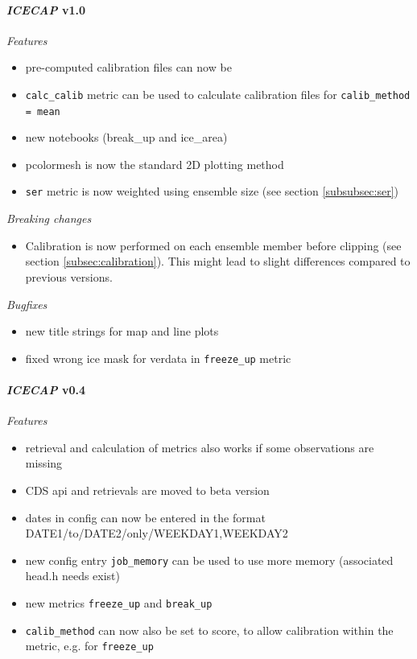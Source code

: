 \documentclass[DIV=10, parskip=full]{scrreprt}
\newcommand{\ice}{\textit{ICECAP}\xspace}
\begin{document}
\paragraph{\textbf{\ice v1.0\\[5pt]}}
\textit{Features}
\begin{itemize}
	\item pre-computed calibration files can now be 
	\item \texttt{calc\_calib} metric can be used to calculate calibration files for \texttt{calib\_method = mean}
	\item new notebooks (break\_up and ice\_area)
	\item pcolormesh is now the standard 2D plotting method
	\item \texttt{ser} metric is now weighted using ensemble size (see section \ref{subsubsec:ser})
\end{itemize}

\textit{Breaking changes}
\begin{itemize}
	\item Calibration is now performed on each ensemble member before clipping (see section \ref{subsec:calibration}). This might lead to slight differences compared to previous versions.
\end{itemize}

\textit{Bugfixes}
\begin{itemize}
	\item new title strings for map and line plots
	\item fixed wrong ice mask for verdata in \texttt{freeze\_up} metric
\end{itemize}

\paragraph{\textbf{\ice v0.4\\[5pt]}}

\textit{Features}
\begin{itemize}
	\item retrieval and calculation of metrics also works if some observations are missing
	\item CDS api and retrievals are moved to beta version
	\item dates in config can now be entered in the format DATE1/to/DATE2/only/WEEKDAY1,WEEKDAY2
	\item new config entry \texttt{job\_memory} can be used to use more memory (associated head.h needs exist)
	\item new metrics \texttt{freeze\_up} and \texttt{break\_up}
	\item \texttt{calib\_method} can now also be set to score, to allow calibration within the metric, e.g. for \texttt{freeze\_up}
\end{itemize}
\end{document}
